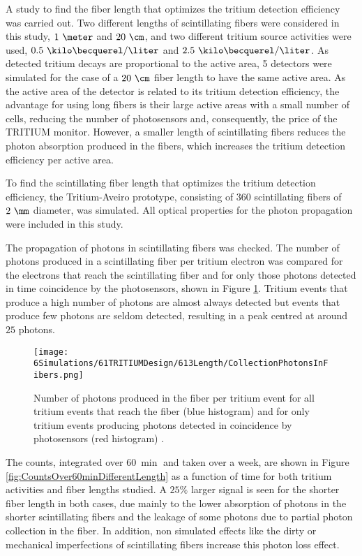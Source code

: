 A study to find the fiber length that optimizes the tritium detection efficiency was carried out. Two different lengths of scintillating fibers were considered in this study, $1~\meter$ and $20~\cm$, and two different tritium source activities were used, $0.5~\kilo\becquerel/\liter$ and $2.5~\kilo\becquerel/\liter$. As detected tritium decays are proportional to the active area, 5 detectors were simulated for the case of a $20~\cm$ fiber length to have the same active area. As the active area of the detector is related to its tritium detection efficiency, the advantage for using long fibers is their large active areas with a small number of cells, reducing the number of photosensors and, consequently, the price of the TRITIUM monitor. However, a smaller length of scintillating fibers reduces the photon absorption produced in the fibers, which increases the tritium detection efficiency per active area.

To find the scintillating fiber length that optimizes the tritium detection efficiency, the Tritium-Aveiro prototype, consisting of $360$ scintillating fibers of $2~\mm$ diameter, was simulated. All optical properties for the photon propagation were included in this study. 

The propagation of photons in scintillating fibers was checked. The number of photons produced in a scintillating fiber per tritium electron was compared for the electrons that reach the scintillating fiber and for only those photons detected in time coincidence by the photosensors, shown in Figure \ref{fig:PhotonsFibersYesNoPhotosensors}. Tritium events that produce a high number of photons are almost always detected but events that produce few photons are seldom detected, resulting in a peak centred at around $25$ photons.  

\begin{figure}[h]
\centering
\texttt{[image: 6Simulations/61TRITIUMDesign/613Length/CollectionPhotonsInFibers.png]}
\caption{Number of photons produced in the fiber per tritium event for all tritium events that reach the fiber (blue histogram) and for only tritium events producing photons detected in coincidence by photosensors (red histogram) \cite{SimulationPaperCarlos}.\label{fig:PhotonsFibersYesNoPhotosensors}}
\end{figure}


The counts, integrated over $60~\min$ and taken over a week, are shown in Figure \ref{fig:CountsOver60minDifferentLength} as a function of time for both tritium activities and fiber lengths studied. A $25\%$ larger signal is seen for the shorter fiber length in both cases, due mainly to the lower absorption of photons in the shorter scintillating fibers and the leakage of some photons due to partial photon collection in the fiber. In addition, non simulated effects like the dirty or mechanical imperfections of scintillating fibers increase this photon loss effect.


